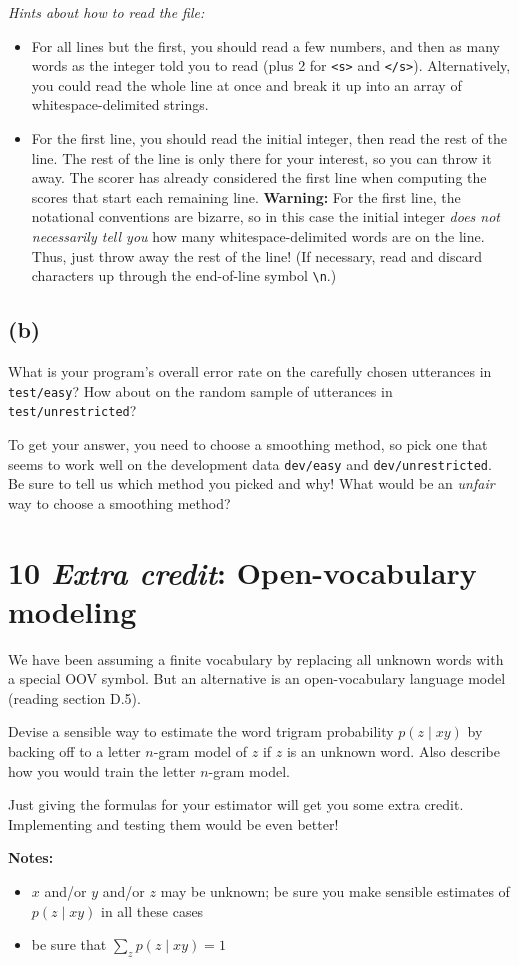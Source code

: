 \documentclass[12pt]{article}
\theoremstyle{plain}
\theoremstyle{definition}
\theoremstyle{remark}
\begin{document}
\textit{Hints about how to read the file:}
\begin{itemize}
    \item For all lines but the first, you should read a few numbers, and then as many words as the integer told you to read (plus 2 for \texttt{<s>} and \texttt{</s>}). Alternatively, you could read the whole line at once and break it up into an array of whitespace-delimited strings.
    \item For the first line, you should read the initial integer, then read the rest of the line. The rest of the line is only there for your interest, so you can throw it away. The scorer has already considered the first line when computing the scores that start each remaining line. \textbf{Warning:} For the first line, the notational conventions are bizarre, so in this case the initial integer \textit{does not necessarily tell you} how many whitespace-delimited words are on the line. Thus, just throw away the rest of the line! (If necessary, read and discard characters up through the end-of-line symbol \texttt{\textbackslash n}.)
\end{itemize}

\subsection*{(b)}
What is your program’s overall error rate on the carefully chosen utterances in \texttt{test/easy}? How about on the random sample of utterances in \texttt{test/unrestricted}?

To get your answer, you need to choose a smoothing method, so pick one that seems to work well on the development data \texttt{dev/easy} and \texttt{dev/unrestricted}. Be sure to tell us which method you picked and why! What would be an \textit{unfair} way to choose a smoothing method?


\section*{10 \textit{Extra credit}: Open-vocabulary modeling}

We have been assuming a finite vocabulary by replacing all unknown words with a special OOV symbol. But an alternative is an open-vocabulary language model (reading section D.5).

Devise a sensible way to estimate the word trigram probability $p(z \mid xy)$ by backing off to a letter $n$-gram model of $z$ if $z$ is an unknown word. Also describe how you would train the letter $n$-gram model.

Just giving the formulas for your estimator will get you some extra credit. Implementing and testing them would be even better!

\textbf{Notes:}
\begin{itemize}
    \item $x$ and/or $y$ and/or $z$ may be unknown; be sure you make sensible estimates of $p(z \mid xy)$ in all these cases
    \item be sure that $\sum_z p(z \mid xy) = 1$
\end{itemize}
\end{document}
